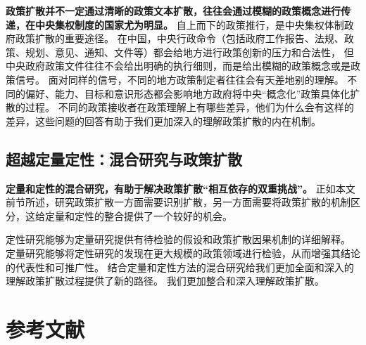 \documentclass[
  12pt,
]{ctexart}
\begin{document}
\textbf{政策扩散并不一定通过清晰的政策文本扩散，往往会通过模糊的政策概念进行传递，在中央集权制度的国家尤为明显。}
自上而下的政策推行，是中央集权体制政府政策扩散的重要途径。
在中国，中央行政命令（包括政府工作报告、法规、政策、规划、意见、通知、文件等）都会给地方进行政策创新的压力和合法性，
但中央政府政策文件往往不会给出明确的执行细则，而是给出模糊的政策概念或是政策信号。
面对同样的信号，不同的地方政策制定者往往会有天差地别的理解。
不同的偏好、能力、目标和意识形态都会影响地方政府将中央``概念化''政策具体化扩散的过程。
不同的政策接收者在政策理解上有哪些差异，他们为什么会有这样的差异，这些问题的回答有助于我们更加深入的理解政策扩散的内在机制。

\hypertarget{ux8d85ux8d8aux5b9aux91cfux5b9aux6027ux6df7ux5408ux7814ux7a76ux4e0eux653fux7b56ux6269ux6563}{%
\subsection{超越定量定性：混合研究与政策扩散}\label{ux8d85ux8d8aux5b9aux91cfux5b9aux6027ux6df7ux5408ux7814ux7a76ux4e0eux653fux7b56ux6269ux6563}}

\textbf{定量和定性的混合研究，有助于解决政策扩散``相互依存的双重挑战''。}
正如本文前节所述，研究政策扩散一方面需要识别扩散，另一方面需要将政策扩散的机制区分，这给定量和定性的整合提供了一个较好的机会。

定性研究能够为定量研究提供有待检验的假设和政策扩散因果机制的详细解释。
定量研究能够将定性研究的发现在更大规模的政策领域进行检验，从而增强其结论的代表性和可推广性。
结合定量和定性方法的混合研究给我们更加全面和深入的理解政策扩散过程提供了新的路径。
我们更加整合和深入理解政策扩散。

\newpage

\hypertarget{ux53c2ux8003ux6587ux732e}{%
\section{参考文献}\label{ux53c2ux8003ux6587ux732e}}
\end{document}
